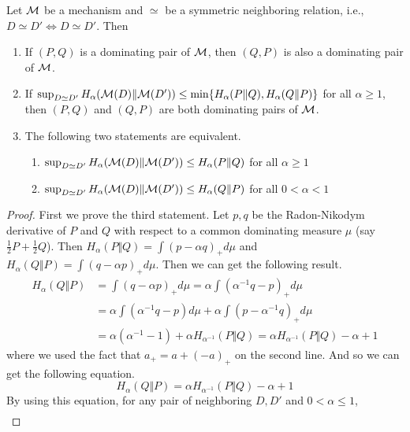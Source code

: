 \documentclass{article}
\begin{document}
\begin{lemma}\label{symmetriclemma}
    Let ${\mathcal{M}}$ be a mechanism and $\simeq$ be a symmetric neighboring relation, i.e., $D\simeq D' \Leftrightarrow D\simeq D'$. Then
    \begin{enumerate}
        \item If $(P,Q)$ is a dominating pair of ${\mathcal{M}}$, then $(Q,P)$ is also a dominating pair of ${\mathcal{M}}$.
        \item If $\sup_{D\simeq D'}H_\alpha({\mathcal{M}}(D) \Vert {\mathcal{M}} (D')) \le \min\{ H_\alpha(P\Vert Q), H_\alpha(Q \Vert P)\} $ for all $\alpha \ge 1$, then $(P,Q)$ and $(Q,P)$ are both dominating pairs of ${\mathcal{M}}$.
        \item The following two statements are equivalent.
        \begin{enumerate}
            \item $\sup_{D\simeq D'}H_\alpha({\mathcal{M}}(D) \Vert {\mathcal{M}} (D')) \le H_\alpha(P \Vert Q)$ for all $\alpha \ge 1$
            \item $\sup_{D\simeq D'}H_\alpha({\mathcal{M}}(D) \Vert {\mathcal{M}} (D')) \le H_\alpha(Q \Vert P)$ for all $0< \alpha < 1$
        \end{enumerate}
    \end{enumerate}
    \begin{proof}
        First we prove the third statement. Let $p,q$ be the Radon-Nikodym derivative of $P$ and $Q$ with respect to a common dominating measure $\mu$ (say $\frac{1}{2}P + \frac{1}{2}Q$). Then $H_\alpha(P\Vert Q) = \int(p-\alpha q)_+ d\mu$ and $H_\alpha(Q\Vert P) = \int (q-\alpha p)_+ d\mu$. Then we can get the following result.
        \begin{align*}
            H_\alpha(Q\Vert P) &= \int(q-\alpha p)_+ d\mu = \alpha \int (\alpha^{-1} q - p)_+ d\mu \\ 
            &= \alpha \int (\alpha^{-1} q - p) d\mu + \alpha \int (p - \alpha^{-1}q)_+ d\mu \\
            &=\alpha(\alpha^{-1} - 1 ) + \alpha H_{\alpha^{-1}}(P\Vert Q)  = \alpha H_{\alpha^{-1}}(P\Vert Q) - \alpha +1
        \end{align*}
    where we used the fact that $a_+ = a + (-a)_+$ on the second line. And so we can get the following equation.
    \begin{equation*}
        H_\alpha(Q \Vert P) = \alpha H_{\alpha^{-1}}(P\Vert Q) - \alpha +1
    \end{equation*}
    By using this equation, for any pair of neighboring $D, D'$ and $0< \alpha \le 1$,
    \begin{align*}

\end{align*}
\end{proof}
\end{lemma}
\end{document}
